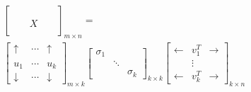 \begin{frame}
\end{frame}

\begin{frame}
	\begin{columns}
		\begin{overlayarea}{\textwidth}{\textheight}
			\vspace{0.5in}
			\footnotesize{
				\begin{align*}
					\begin{split}
						&\begin{bmatrix}
							  &   &   &   &   \\
							  &   &   &   &   \\
							  &   & X &   &   \\
							  &   &   &   &
						\end{bmatrix}_{m \times n} = \\
						&\begin{bmatrix}
							\uparrow   & \cdots & \uparrow   \\
							           &        &            \\
							u_1        & \cdots & u_k        \\
							\downarrow & \cdots & \downarrow
						\end{bmatrix}_{m \times k}
						\begin{bmatrix}
							\sigma_1 &        &          \\
							         & \ddots &          \\
							         &        & \sigma_k
						\end{bmatrix}_{k \times k}\begin{bmatrix}
							\leftarrow & v_1^T    & \rightarrow \\
							           & \vdots &             \\
							\leftarrow & v_k^T    & \rightarrow
						\end{bmatrix}_{k \times n}
					\end{split} \\
				\end{align*}
			}
		\end{overlayarea}
		\begin{overlayarea}{\textwidth}{\textheight}
\end{overlayarea}
\end{columns}
\end{frame}
